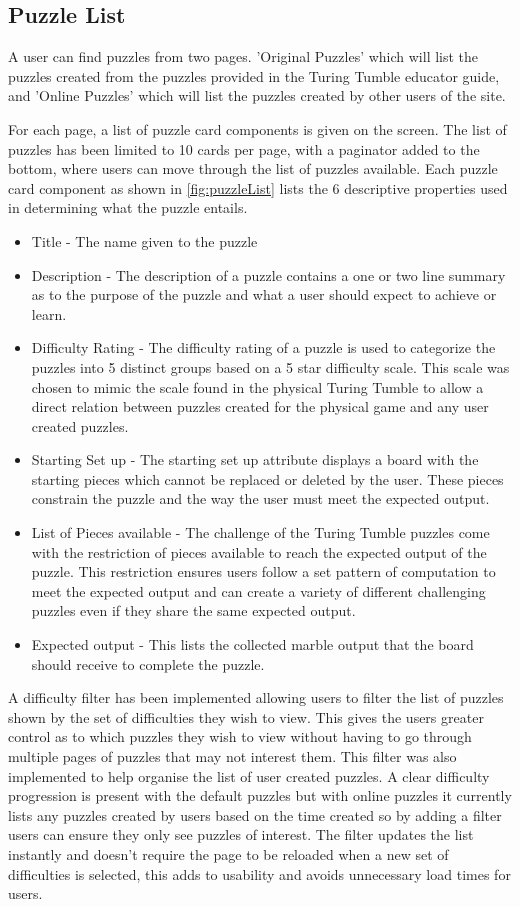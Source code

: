 \documentclass{l4proj}
\begin{document}
\subsection{Puzzle List}
A user can find puzzles from two pages. 'Original Puzzles' which will list the puzzles created from the puzzles provided in the Turing Tumble educator guide, and 'Online Puzzles' which will list the puzzles created by other users of the site.

For each page, a list of puzzle card components is given on the screen. The list of puzzles has been limited to 10 cards per page, with a paginator added to the bottom, where users can move through the list of puzzles available. Each puzzle card component as shown in \ref{fig:puzzleList} lists the 6 descriptive properties used in determining what the puzzle entails. 
\begin{itemize}
    \item Title - The name given to the puzzle
    \item Description - The description of a puzzle contains a one or two line summary as to the purpose of the puzzle and what a user should expect to achieve or learn.
    \item Difficulty Rating - The difficulty rating of a puzzle is used to categorize the puzzles into 5 distinct groups based on a 5 star difficulty scale. This scale was chosen to mimic the scale found in the physical Turing Tumble to allow a direct relation between puzzles created for the physical game and any user created puzzles.
    \item Starting Set up - The starting set up attribute displays a board with the starting pieces which cannot be replaced or deleted by the user. These pieces constrain the puzzle and the way the user must meet the expected output.
    \item List of Pieces available - The challenge of the Turing Tumble puzzles come with the restriction of pieces available to reach the expected output of the puzzle. This restriction ensures users follow a set pattern of computation to meet the expected output and can create a variety of different challenging puzzles even if they share the same expected output.
    \item Expected output - This lists the collected marble output that the board should receive to complete the puzzle.
\end{itemize}

A difficulty filter has been implemented allowing users to filter the list of puzzles shown by the set of difficulties they wish to view. This gives the users greater control as to which puzzles they wish to view without having to  go through multiple pages of puzzles that may not interest them. This filter was also implemented to help organise the list of user created puzzles. A clear difficulty progression is present with the default puzzles but with online puzzles it currently lists any puzzles created by users based on the time created so by adding a filter users can ensure they only see puzzles of interest. The filter updates the list instantly and doesn't require the page to be reloaded when a new set of difficulties is selected, this adds to usability and avoids unnecessary load times for users.
\end{document}
